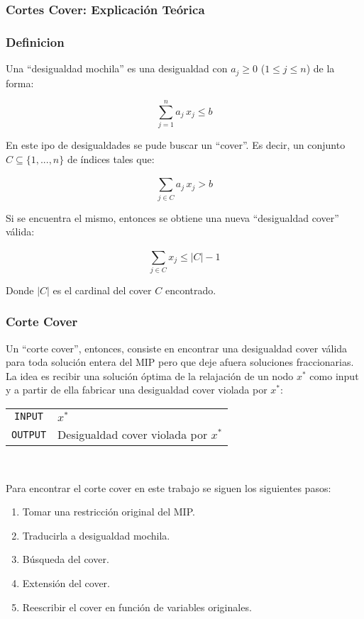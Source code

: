 \subsubsection{Cortes Cover: Explicación Teórica}

\subsubsection*{Definicion}
Una ``desigualdad mochila'' es una desigualdad con $a_j \geq 0$ ($1\leq j \leq n$) de la forma:

$$ \overset{n}{\underset{j=1}{\sum}} a_j\,x_j \leq b$$

En este ipo de desigualdades se pude buscar un ``cover''. Es decir, un conjunto $C \subseteq \{1,...,n\}$ de índices tales que:

$$ \overset{}{\underset{j \in C}{\sum}} a_j\,x_j > b$$

Si se encuentra el mismo, entonces se obtiene una nueva ``desigualdad cover'' válida:

$$ \overset{}{\underset{j \in C}{\sum}} x_j \leq |C| - 1$$

Donde $|C|$ es el cardinal del cover $C$ encontrado.

\subsubsection*{Corte Cover}

Un ``corte cover'', entonces, consiste en encontrar una desigualdad cover válida para toda solución entera del MIP pero que deje afuera soluciones fraccionarias. La idea es recibir una solución óptima de la relajación de un nodo $x^*$ como input y a partir de ella fabricar una desigualdad cover violada por $x^*$:\\

{
\centering
\begin{tabular}{c l}
\verb_INPUT_ & $x^*$\\
\verb_OUTPUT_ & Desigualdad cover violada por $x^*$\\
\end{tabular}\\
\vspace{5mm}
}

Para encontrar el corte cover en este trabajo se siguen los siguientes pasos:

\begin{enumerate}
\item Tomar una restricción original del MIP.
\item Traducirla a desigualdad mochila.
\item Búsqueda del cover.
\item Extensión del cover.
\item Reescribir el cover en función de variables originales.
\end{enumerate}

